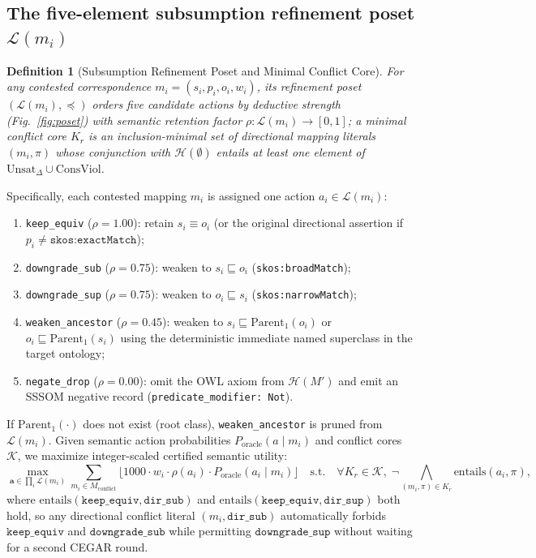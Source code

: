 \documentclass[10pt]{article}
\theoremstyle{accentdef}
\newtheorem{definition}{Definition}
\begin{document}
\subsection*{The five-element subsumption refinement poset $\mathcal{L}(m_i)$}

\begin{definition}[Subsumption Refinement Poset and Minimal Conflict Core]
\label{def:poset}
For any contested correspondence $m_i = (s_i, p_i, o_i, w_i)$, its \emph{refinement poset} $(\mathcal{L}(m_i), \preceq)$ orders five candidate actions by deductive strength (Fig.~\ref{fig:poset}) with semantic retention factor $\rho : \mathcal{L}(m_i) \to [0, 1]$; a \emph{minimal conflict core} $K_r$ is an inclusion-minimal set of directional mapping literals $(m_i, \pi)$ whose conjunction with $\mathcal{H}(\emptyset)$ entails at least one element of $\mathrm{Unsat}_{\Delta} \cup \mathrm{ConsViol}$.
\end{definition}

Specifically, each contested mapping $m_i$ is assigned one action $a_i \in \mathcal{L}(m_i)$:
\begin{enumerate}
  \item \texttt{keep\_equiv} ($\rho = 1.00$): retain $s_i \equiv o_i$ (or the original directional assertion if $p_i \neq \texttt{skos:exactMatch}$);
  \item \texttt{downgrade\_sub} ($\rho = 0.75$): weaken to $s_i \sqsubseteq o_i$ (\texttt{skos:broadMatch});
  \item \texttt{downgrade\_sup} ($\rho = 0.75$): weaken to $o_i \sqsubseteq s_i$ (\texttt{skos:narrowMatch});
  \item \texttt{weaken\_ancestor} ($\rho = 0.45$): weaken to $s_i \sqsubseteq \mathrm{Parent}_1(o_i)$ or $o_i \sqsubseteq \mathrm{Parent}_1(s_i)$ using the deterministic immediate named superclass in the target ontology;
  \item \texttt{negate\_drop} ($\rho = 0.00$): omit the OWL axiom from $\mathcal{H}(M')$ and emit an SSSOM negative record (\texttt{predicate\_modifier: Not}).
\end{enumerate}
If $\mathrm{Parent}_1(\cdot)$ does not exist (root class), \texttt{weaken\_ancestor} is pruned from $\mathcal{L}(m_i)$. Given semantic action probabilities $P_{\mathrm{oracle}}(a \mid m_i)$ and conflict cores $\mathcal{K}$, we maximize integer-scaled certified semantic utility:
\begin{equation}
\label{eq:asp_obj}
\max_{\mathbf{a} \in \prod_i \mathcal{L}(m_i)} \sum_{m_i \in M_{\mathrm{conflict}}} \bigl\lfloor 1000 \cdot w_i \cdot \rho(a_i) \cdot P_{\mathrm{oracle}}(a_i \mid m_i) \bigr\rfloor \quad \text{s.t.} \quad \forall K_r \in \mathcal{K},\; \neg \bigwedge_{(m_i, \pi) \in K_r} \mathrm{entails}(a_i, \pi),
\end{equation}
where $\mathrm{entails}(\texttt{keep\_equiv}, \texttt{dir\_sub})$ and $\mathrm{entails}(\texttt{keep\_equiv}, \texttt{dir\_sup})$ both hold, so any directional conflict literal $(m_i, \texttt{dir\_sub})$ automatically forbids $\texttt{keep\_equiv}$ and $\texttt{downgrade\_sub}$ while permitting $\texttt{downgrade\_sup}$ without waiting for a second CEGAR round.
\end{document}
